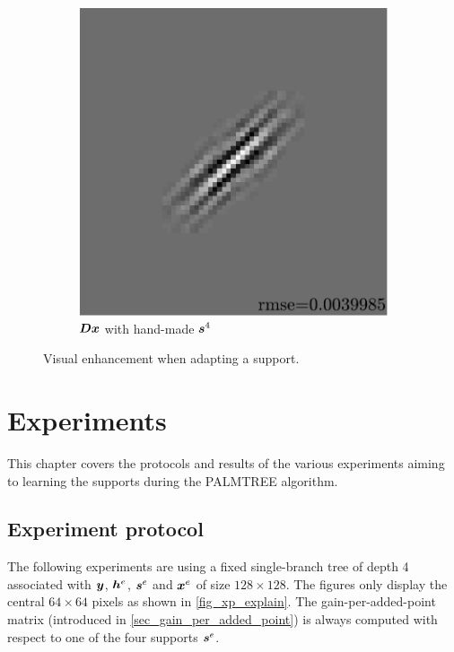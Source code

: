 \begin{figure}[!ht]
\begin{subfigure}[b]{0.09\textwidth}
	\caption{}
\end{subfigure}
\begin{subfigure}[b]{0.39\textwidth}\centering
	\includegraphics[width=\textwidth]{figures/exple-better-support/xp_128x128_sc2_angl1_K3_S3_node4expected_approx.pdf}
	\caption{$\bm{D}\bm{x}$ with hand-made $\bm{s}^4$}
\end{subfigure}
\caption{Visual enhancement when adapting a support.} \label{fig_xp_fixed_vs_expected}
\end{figure}




\chapter{Experiments}

This chapter covers the protocols and results of the various experiments aiming to learning the supports during the PALMTREE algorithm.

\section{Experiment protocol}
The following experiments are using a fixed single-branch tree of depth 4 associated with $\bm{y}$, $\bm{h}^e$, $\bm{s}^e$ and $\bm{x}^e$ of size $128 \times 128$. The figures only display the central $64 \times 64$ pixels as shown in \cref{fig_xp_explain}. The gain-per-added-point matrix (introduced in \cref{sec_gain_per_added_point}) is always computed with respect to one of the four supports $\bm{s}^e$.


